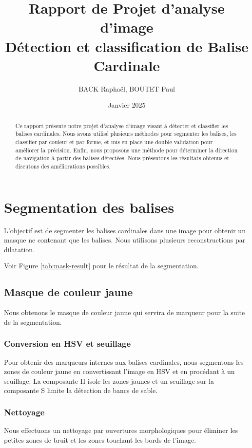 \documentclass{article}
\title{Rapport de Projet d'analyse d'image\\ Détection et classification de Balise Cardinale}
\author{BACK Raphaël, BOUTET Paul}
\date{Janvier 2025}
\begin{document}
\maketitle

\begin{abstract}
    Ce rapport présente notre projet d'analyse d'image visant à détecter et classifier les balises cardinales. Nous avons utilisé plusieurs méthodes pour segmenter les balises, les classifier par couleur et par forme, et mis en place une double validation pour améliorer la précision. Enfin, nous proposons une méthode pour déterminer la direction de navigation à partir des balises détectées. Nous présentons les résultats obtenus et discutons des améliorations possibles.
\end{abstract}

\setcounter{tocdepth}{2}
\tableofcontents

\newpage

\section{Segmentation des balises}

L'objectif est de segmenter les balises cardinales dans une image pour obtenir
un masque ne contenant que les balises. Nous utilisons plusieurs
reconstructions par dilatation.

Voir Figure \ref{tab:mask-result} pour le résultat de la segmentation.

\subsection{Masque de couleur jaune}

Nous obtenons le masque de couleur jaune qui servira de marqueur pour la suite
de la segmentation.

\subsubsection{Conversion en HSV et seuillage}
Pour obtenir des marqueurs internes aux balises cardinales, nous segmentons les
zones de couleur jaune en convertissant l'image en HSV et en procédant à un
seuillage. La composante H isole les zones jaunes et un seuillage sur la
composante S limite la détection de bancs de sable.

\subsubsection{Nettoyage}
Nous effectuons un nettoyage par ouvertures morphologiques pour éliminer les
petites zones de bruit et les zones touchant les bords de l'image.
\end{document}
